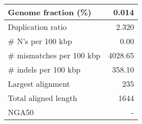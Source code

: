 \documentclass[12pt,a4paper]{article}
\begin{document}
\begin{table}[ht]
\begin{center}
\begin{tabular}{|l*{1}{|r}|}
Genome fraction (\%) & 0.014 \\ \hline
Duplication ratio & 2.320 \\ \hline
\# N's per 100 kbp & 0.00 \\ \hline
\# mismatches per 100 kbp & 4028.65 \\ \hline
\# indels per 100 kbp & 358.10 \\ \hline
Largest alignment & 235 \\ \hline
Total aligned length & 1644 \\ \hline
NGA50 & - \\ \hline
\end{tabular}
\end{center}
\end{table}
\end{document}
